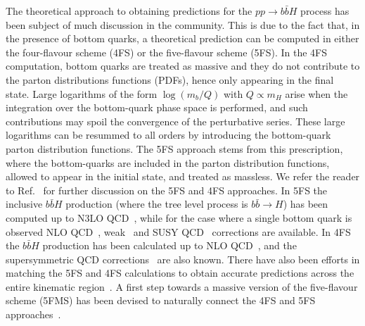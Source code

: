 \documentclass[main.tex]{subfiles}
\begin{document}
The theoretical approach to obtaining predictions for the $pp\to b\bar{b}H$ process has been subject
of much discussion in the community. This is due to the fact that, in the presence of bottom quarks,
a theoretical prediction can be computed in either the four-flavour scheme (4FS) or the five-flavour
scheme (5FS). In the 4FS computation, bottom quarks are treated as massive and they do not
contribute to the parton distributions functions (PDFs), hence only appearing in the final state.
Large logarithms of the form $\log(m_b/Q)$ with $Q \propto m_H$ arise when the integration over the
bottom-quark phase space is performed, and such contributions may spoil the convergence of the
perturbative series. These large logarithms can be resummed to all orders by introducing the
bottom-quark parton distribution functions.  The 5FS approach stems from this prescription, where
the bottom-quarks are included in the parton distribution functions, allowed to appear in the
initial state, and treated as massless.  We refer the reader to Ref.~\cite{Maltoni:2012pa} for further
discussion on the 5FS and 4FS approaches. 
In 5FS the inclusive $b\bar{b}H$ production (where the tree level process is $b\bar{b}\to H$) has been computed up to
N3LO QCD~\cite{Dicus:1998hs,Balazs:1998sb,Maltoni:2003pn,Harlander:2010cz,Buehler:2012cu,Harlander:2012pb,H:2019nsw,Duhr:2019kwi,Mondini:2021nck}, 
while for the case where a single bottom quark is observed NLO QCD~\cite{Campbell:2002zm}, weak~\cite{Dawson:2010yz} 
and SUSY QCD~\cite{Dawson:2011pe} corrections are available.
In 4FS the $b\bar{b}H$ production has been calculated up to 
NLO QCD~\cite{Dittmaier:2003ej,Dawson:2003kb,Dawson:2004sh,Wiesemann:2014ioa,Jager:2015hka,Deutschmann:2018avk},
and the supersymmetric QCD corrections~\cite{Liu:2012qu,Dittmaier:2014sva} are also known.  
There have also been efforts in matching the 5FS and 4FS calculations to obtain accurate predictions across the entire kinematic region~\cite{Harlander:2011aa,Bonvini:2015pxa,Forte:2015hba,Forte:2016sja,Duhr:2020kzd}. 
A first step towards a massive version of the five-flavour scheme (5FMS) has been devised to naturally connect the 4FS and 5FS approaches~\cite{Krauss:2017wmx,Figueroa:2018chn}.
\end{document}
